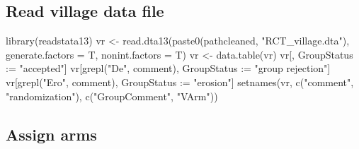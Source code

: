 \subsection{Read village data file}

\begin{Schunk}
\begin{Sinput}
library(readstata13)
vr <- read.dta13(paste0(pathcleaned, "RCT_village.dta"), 
  generate.factors = T, nonint.factors = T)
vr <- data.table(vr)
vr[, GroupStatus := "accepted"]
vr[grepl("De", comment), GroupStatus := "group rejection"]
vr[grepl("Ero", comment), GroupStatus := "erosion"]
setnames(vr, c("comment", "randomization"), c("GroupComment", "VArm"))
\end{Sinput}
\end{Schunk}


\subsection{Assign arms}


